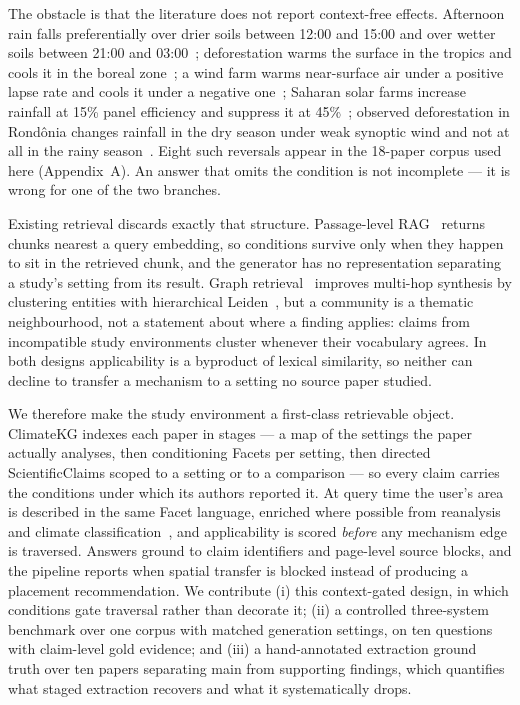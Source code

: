 \documentclass{article}
\begin{document}
The obstacle is that the literature does not report context-free effects. Afternoon
rain falls preferentially over drier soils between 12:00 and 15:00 and over wetter
soils between 21:00 and 03:00~\citep{taylor2012afternoon}; deforestation warms the
surface in the tropics and cools it in the boreal zone~\citep{luo2024decreased}; a
wind farm warms near-surface air under a positive lapse rate and cools it under a
negative one~\citep{roy2010impacts}; Saharan solar farms increase rainfall at 15\%
panel efficiency and suppress it at 45\%~\citep{li2018sahara}; observed
deforestation in Rond\^onia changes rainfall in the dry season under weak synoptic
wind and not at all in the rainy season~\citep{wang1999amazonia}. Eight such
reversals appear in the 18-paper corpus used here (Appendix~A). An answer that omits
the condition is not incomplete --- it is wrong for one of the two branches.

Existing retrieval discards exactly that structure. Passage-level
RAG~\citep{lewis2020rag} returns chunks nearest a query embedding, so conditions
survive only when they happen to sit in the retrieved chunk, and the generator has
no representation separating a study's setting from its result. Graph
retrieval~\citep{edge2024graphrag} improves multi-hop synthesis by clustering entities
with hierarchical Leiden~\citep{traag2019leiden}, but a community is a thematic
neighbourhood, not a statement about where a finding applies: claims from incompatible
study environments cluster whenever their vocabulary agrees. In both designs
applicability is a byproduct of lexical similarity, so neither can decline to transfer a
mechanism to a setting no source paper studied.

We therefore make the study environment a first-class retrievable object. ClimateKG
indexes each paper in stages --- a map of the settings the paper actually analyses,
then conditioning Facets per setting, then directed ScientificClaims scoped to a
setting or to a comparison --- so every claim carries the conditions under which its
authors reported it. At query time the user's area is described in the same Facet
language, enriched where possible from reanalysis and climate
classification~\citep{hersbach2020era5,beck2018koppen}, and applicability is scored
\emph{before} any mechanism edge is traversed. Answers ground to claim identifiers
and page-level source blocks, and the pipeline reports when spatial transfer is
blocked instead of producing a placement recommendation. We contribute (i) this
context-gated design, in which conditions gate traversal rather than decorate it;
(ii) a controlled three-system benchmark over one corpus with matched generation
settings, on ten questions with claim-level gold evidence; and (iii) a
hand-annotated extraction ground truth over ten papers separating main from
supporting findings, which quantifies what staged extraction recovers and what it
systematically drops.
\end{document}
